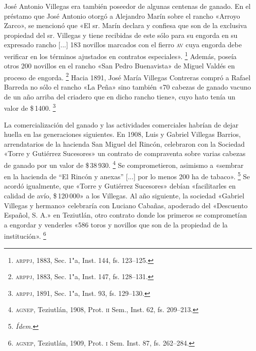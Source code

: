 \documentclass[14pt,twoside,final]{extbook} %
\let\oldfootnote\footnote
\renewcommand\footnote[1]{%
\oldfootnote{\hspace{1mm}#1}}
\begin{document}
José Antonio Villegas era también poseedor de algunas centenas de ganado. En el préstamo que José Antonio otorgó a Alejandro Marín sobre el rancho «Arroyo Zarco», se mencionó que «El sr. Marín declara y confiesa que son de la exclusiva propiedad del sr. Villegas y tiene recibidas de este sólo para su engorda en su expresado rancho [...] 183 novillos marcados con el fierro \textsc{av} cuya engorda debe verificar en los términos ajustados en contratos especiales».\footnote{\textsc{arppj}, 1883, Sec. 1"a, Inst. 144, fs. 123--125.} Además, poseía otros 200 novillos en el rancho «San Pedro Buenavista» de Miguel Valdés en proceso de engorda.\footnote{\textsc{arppj}, 1883, Sec. 1"a, Inst. 147, fs. 128--131.} Hacia 1891, José María Villegas Contreras compró a Rafael Barreda no sólo el rancho «La Peña» sino también «70 cabezas de ganado vacuno de un año arriba del criadero que en dicho rancho tiene», cuyo hato tenía un valor de \$\,1400.\footnote{\textsc{arppj}, 1891, Sec. 1"a, Inst. 93, fs. 129--130.}

La comercialización del ganado y las actividades comerciales habrían de dejar huella en las generaciones siguientes. En 1908, Luis y Gabriel Villegas Barrios, arrendatarios de la hacienda San Miguel del Rincón, celebraron con la Sociedad «Torre y Gutiérrez Sucesores» un contrato de compraventa sobre varias cabezas de ganado por un valor de \$\,38\,930.\footnote{\textsc{agnep}, Teziutlán, 1908, Prot. \textsc{ii} Sem., Inst. 62, fs. 209--213.} Se comprometieron, asimismo a «sembrar en la hacienda de ``El Rincón y anexas'' [...] por lo menos 200 ha de tabaco».\footnote{\em Ídem.} Se acordó igualmente, que «Torre y Gutiérrez Sucesores» debían «facilitarles en calidad de avío, \$\,120\,000» a los Villegas. Al año siguiente, la sociedad «Gabriel Villegas y hermano» celebraría con Luciano Cabañas, apoderado del «Descuento Español, S. A.» en Teziutlán, otro contrato donde los primeros se comprometían a engordar y venderles «586 toros y novillos que son de la propiedad de la institución».\footnote{\textsc{agnep}, Teziutlán, 1909, Prot. \textsc{i} Sem. Inst. 87, fs. 262--284.}
\end{document}
